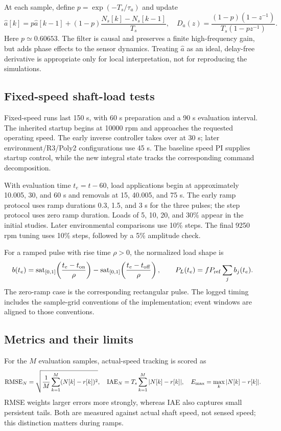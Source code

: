 At each sample, define $p=\exp(-T_s/\tau_a)$ and update
\begin{equation}
\hat a[k]=p\hat a[k-1]+(1-p)\frac{N_s[k]-N_s[k-1]}{T_s},\quad
D_a(z)=\frac{(1-p)(1-z^{-1})}{T_s(1-pz^{-1})}.
\label{eq:filter}
\end{equation}
Here $p\simeq0.60653$. The filter is causal and preserves a finite high-frequency gain, but adds phase effects to the sensor dynamics. Treating $\hat a$ as an ideal, delay-free derivative is appropriate only for local interpretation, not for reproducing the simulations.

\subsection{Fixed-speed shaft-load tests}
Fixed-speed runs last 150 s, with 60 s preparation and a 90 s evaluation interval. The inherited startup begins at 10000 rpm and approaches the requested operating speed. The early inverse controller takes over at 30 s; later environment/R3/Poly2 configurations use 45 s. The baseline speed PI supplies startup control, while the new integral state tracks the corresponding command decomposition.

With evaluation time $t_e=t-60$, load applications begin at approximately 10.005, 30, and 60 s and removals at 15, 40.005, and 75 s. The early ramp protocol uses ramp durations 0.3, 1.5, and 3 s for the three pulses; the step protocol uses zero ramp duration. Loads of 5, 10, 20, and 30\% appear in the initial studies. Later environmental comparisons use 10\% steps. The final 9250 rpm tuning uses 10\% steps, followed by a 5\% amplitude check.

For a ramped pulse with rise time $\rho>0$, the normalized load shape is
\begin{equation}
b(t_e)=\operatorname{sat}_{[0,1]}\!\left(\frac{t_e-t_{\rm on}}{\rho}\right)
-\operatorname{sat}_{[0,1]}\!\left(\frac{t_e-t_{\rm off}}{\rho}\right),\qquad
P_L(t_e)=f P_{\rm ref}\sum_j b_j(t_e).
\end{equation}
The zero-ramp case is the corresponding rectangular pulse. The logged timing includes the sample-grid conventions of the implementation; event windows are aligned to those conventions.

\subsection{Metrics and their limits}
For the $M$ evaluation samples, actual-speed tracking is scored as
\begin{equation}
\operatorname{RMSE}_N=\sqrt{\frac1M\sum_{k=1}^M(N[k]-r[k])^2},\quad
\mathrm{IAE}_N=T_s\sum_{k=1}^M|N[k]-r[k]|,\quad
E_{\max}=\max_k|N[k]-r[k]|.
\end{equation}
RMSE weights larger errors more strongly, whereas IAE also captures small persistent tails. Both are measured against actual shaft speed, not sensed speed; this distinction matters during ramps.

